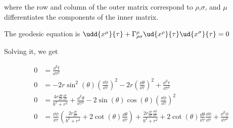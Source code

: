 \documentclass[12pt]{article}
\begin{document}
where the row and column of the outer matrix correspond to $\rho$,$\sigma$, and $\mu$ differentiates the components of the inner matrix.

The geodesic equation is $\udd{x^\mu}{\tau}+\Gamma^\mu_{\rho\sigma}\ud{x^\rho}{\tau}\ud{x^\sigma}{\tau}=0$

Solving it, we get

\begin{align*}
0&=\frac{\dd ^2t}{\dd \tau ^2}\\ 0 &= -2 r \sin ^2(\theta ) \left(\frac{\dd \phi }{\dd \tau }\right)^2-2 r \left(\frac{\dd \theta }{\dd \tau }\right)^2+\frac{\dd ^2r}{\dd \tau ^2}\\ 0&= \frac{4 r \frac{\dd \theta }{\dd \tau } \frac{\dd r}{\dd \tau }}{b^2+r^2}+\frac{\dd ^2\theta }{\dd \tau ^2}-2 \sin (\theta ) \cos (\theta ) \left(\frac{\dd \phi }{\dd \tau }\right)^2\\ 0&=\frac{\dd \phi }{\dd \tau } \left(\frac{2 r \frac{\dd r}{\dd \tau }}{b^2+r^2}+2 \cot (\theta ) \frac{\dd \theta }{\dd \tau }\right)+\frac{2 r \frac{\dd r}{\dd \tau } \frac{\dd \phi }{\dd \tau }}{b^2+r^2}+2 \cot (\theta ) \frac{\dd \theta }{\dd \tau } \frac{\dd \phi }{\dd \tau }+\frac{\dd ^2\phi }{\dd \tau ^2}
\end{align*}
\end{document}
